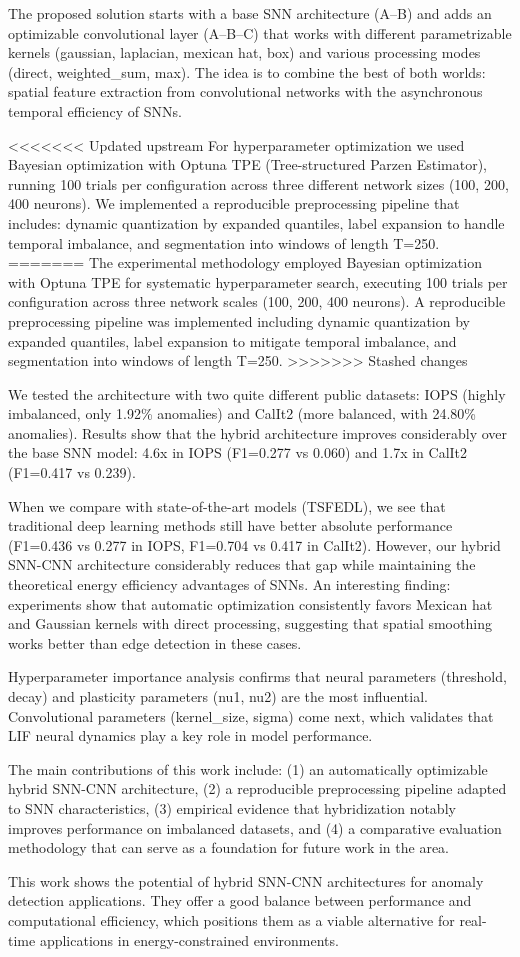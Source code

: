 The proposed solution starts with a base SNN architecture (A--B) and adds an optimizable convolutional layer (A--B--C) that works with different parametrizable kernels (gaussian, laplacian, mexican hat, box) and various processing modes (direct, weighted\_sum, max). The idea is to combine the best of both worlds: spatial feature extraction from convolutional networks with the asynchronous temporal efficiency of SNNs.

<<<<<<< Updated upstream
For hyperparameter optimization we used Bayesian optimization with Optuna TPE (Tree-structured Parzen Estimator), running 100 trials per configuration across three different network sizes (100, 200, 400 neurons). We implemented a reproducible preprocessing pipeline that includes: dynamic quantization by expanded quantiles, label expansion to handle temporal imbalance, and segmentation into windows of length T=250.
=======
The experimental methodology employed Bayesian optimization with Optuna TPE for systematic hyperparameter search, executing 100 trials per configuration across three network scales (100, 200, 400 neurons). A reproducible preprocessing pipeline was implemented including dynamic quantization by expanded quantiles, label expansion to mitigate temporal imbalance, and segmentation into windows of length T=250.
>>>>>>> Stashed changes

We tested the architecture with two quite different public datasets: IOPS (highly imbalanced, only 1.92\% anomalies) and CalIt2 (more balanced, with 24.80\% anomalies). Results show that the hybrid architecture improves considerably over the base SNN model: 4.6x in IOPS (F1=0.277 vs 0.060) and 1.7x in CalIt2 (F1=0.417 vs 0.239).

When we compare with state-of-the-art models (TSFEDL), we see that traditional deep learning methods still have better absolute performance (F1=0.436 vs 0.277 in IOPS, F1=0.704 vs 0.417 in CalIt2). However, our hybrid SNN-CNN architecture considerably reduces that gap while maintaining the theoretical energy efficiency advantages of SNNs. An interesting finding: experiments show that automatic optimization consistently favors Mexican hat and Gaussian kernels with direct processing, suggesting that spatial smoothing works better than edge detection in these cases.

Hyperparameter importance analysis confirms that neural parameters (threshold, decay) and plasticity parameters (nu1, nu2) are the most influential. Convolutional parameters (kernel\_size, sigma) come next, which validates that LIF neural dynamics play a key role in model performance.

The main contributions of this work include: (1) an automatically optimizable hybrid SNN-CNN architecture, (2) a reproducible preprocessing pipeline adapted to SNN characteristics, (3) empirical evidence that hybridization notably improves performance on imbalanced datasets, and (4) a comparative evaluation methodology that can serve as a foundation for future work in the area.

This work shows the potential of hybrid SNN-CNN architectures for anomaly detection applications. They offer a good balance between performance and computational efficiency, which positions them as a viable alternative for real-time applications in energy-constrained environments.